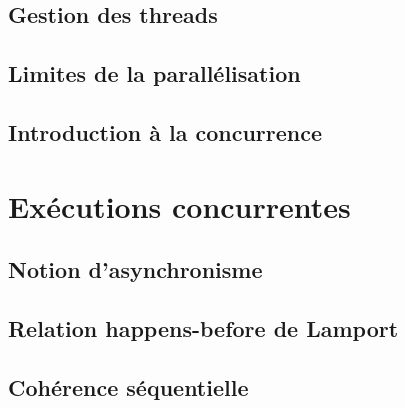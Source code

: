 \documentclass[9pt]{beamer}
\begin{document}
\subsection{Gestion des threads}








 
\subsection{Limites de la parallélisation}




 
\subsection{Introduction à la concurrence}





 
\section{Exécutions concurrentes}
 
\subsection{Notion d'asynchronisme}


 
\subsection{Relation happens-before de Lamport}



 
\subsection{Cohérence séquentielle}


 
\end{document}
